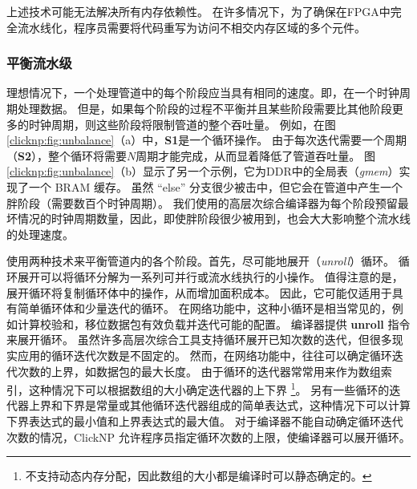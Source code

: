 上述技术可能无法解决所有内存依赖性。
在许多情况下，为了确保在FPGA中完全流水线化，程序员需要将代码重写为访问不相交内存区域的多个元件。


\subsubsection{平衡流水级}
理想情况下，一个处理管道中的每个阶段应当具有相同的速度。即，在一个时钟周期处理数据。
但是，如果每个阶段的过程不平衡并且某些阶段需要比其他阶段更多的时钟周期，则这些阶段将限制管道的整个吞吐量。
例如，在图 \ref {clicknp:fig:unbalance}（a）中，\textbf {S1}是一个循环操作。
由于每次迭代需要一个周期（\textbf {S2}），整个循环将需要$N$周期才能完成，从而显着降低了管道吞吐量。
图 \ref {clicknp:fig:unbalance}（b）显示了另一个示例，它为DDR中的全局表（\textit {gmem}）实现了一个 BRAM 缓存。
虽然 ``else'' 分支很少被击中，但它会在管道中产生一个胖阶段（需要数百个时钟周期）。
我们使用的高层次综合编译器为每个阶段预留最坏情况的时钟周期数量，因此，即使胖阶段很少被用到，也会大大影响整个流水线的处理速度。

\name 使用两种技术来平衡管道内的各个阶段。首先，尽可能地展开（\textit {unroll}）循环。
循环展开可以将循环分解为一系列可并行或流水线执行的小操作。
值得注意的是，展开循环将复制循环体中的操作，从而增加面积成本。
因此，它可能仅适用于具有简单循环体和少量迭代的循环。
在网络功能中，这种小循环是相当常见的，例如计算校验和，移位数据包有效负载并迭代可能的配置。
\name{} 编译器提供 \textbf {unroll} 指令来展开循环。
虽然许多高层次综合工具支持循环展开已知次数的迭代，但很多现实应用的循环迭代次数是不固定的。
然而，在网络功能中，往往可以确定循环迭代次数的上界，如数据包的最大长度。
由于循环的迭代器常常用来作为数组索引，这种情况下可以根据数组的大小确定迭代器的上下界 \footnote{\name{} 不支持动态内存分配，因此数组的大小都是编译时可以静态确定的。}。
另有一些循环的迭代器上界和下界是常量或其他循环迭代器组成的简单表达式，这种情况下可以计算下界表达式的最小值和上界表达式的最大值。
对于编译器不能自动确定循环迭代次数的情况，ClickNP 允许程序员指定循环次数的上限，使编译器可以展开循环。

